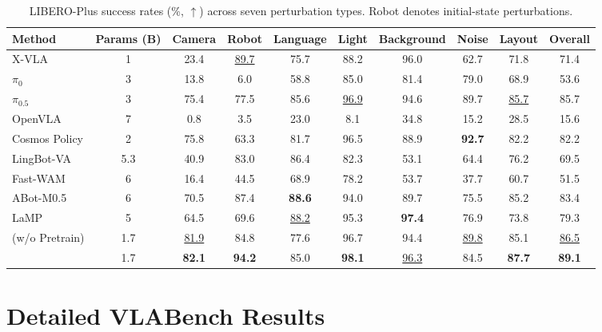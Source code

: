 \begin{table}[!htbp]
    \centering
    \small
    \setlength{\tabcolsep}{3pt}
    \renewcommand{\arraystretch}{1.10}
    \caption{LIBERO-Plus success rates (\%, $\uparrow$) across seven
    perturbation types. Robot denotes initial-state perturbations.}
    \label{tab:experiments:libero_plus}
    \vspace{3pt}
    \begin{adjustbox}{max width=\linewidth}
    \begin{tabular}{@{}lccccccccc@{}}
        \toprule
        Method & Params (B) & Camera & Robot & Language & Light
        & Background & Noise & Layout & Overall \\
        \midrule
        X-VLA & 1 & 23.4 & \underline{89.7} & 75.7 & 88.2 & 96.0 & 62.7 & 71.8 & 71.4 \\
        $\pi_{0}$ & 3 & 13.8 & 6.0 & 58.8 & 85.0 & 81.4 & 79.0 & 68.9 & 53.6 \\
        $\pi_{0.5}$ & 3 & 75.4 & 77.5 & 85.6 & \underline{96.9} & 94.6 & 89.7 & \underline{85.7} & 85.7 \\
        OpenVLA & 7 & 0.8 & 3.5 & 23.0 & 8.1 & 34.8 & 15.2 & 28.5 & 15.6 \\
        Cosmos Policy & 2 & 75.8 & 63.3 & 81.7 & 96.5 & 88.9 & \textbf{92.7} & 82.2 & 82.2 \\
        LingBot-VA & 5.3 & 40.9 & 83.0 & 86.4 & 82.3 & 53.1 & 64.4 & 76.2 & 69.5 \\
        Fast-WAM & 6 & 16.4 & 44.5 & 68.9 & 78.2 & 53.7 & 37.7 & 60.7 & 51.5 \\
        ABot-M0.5 & 6 & 70.5 & 87.4 & \textbf{88.6} & 94.0 & 89.7 & 75.5 & 85.2 & 83.4 \\
        LaMP & 5 & 64.5 & 69.6 & \underline{88.2} & 95.3 & \textbf{97.4} & 76.9 & 73.8 & 79.3 \\
        \midrule
        \method{} (w/o Pretrain) & 1.7 & \underline{81.9} & 84.8 & 77.6 & 96.7 & 94.4 & \underline{89.8} & 85.1 & \underline{86.5} \\
        \method{} & 1.7 & \textbf{82.1} & \textbf{94.2} & 85.0 & \textbf{98.1} & \underline{96.3} & 84.5 & \textbf{87.7} & \textbf{89.1} \\
        \bottomrule
    \end{tabular}
    \end{adjustbox}
\end{table}


\section{Detailed VLABench Results}
\label{app:vlabench}

